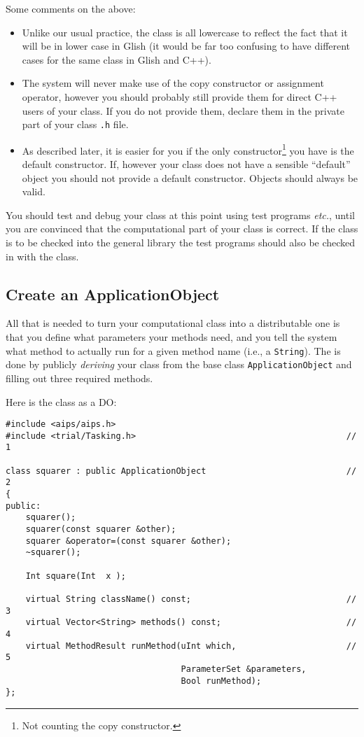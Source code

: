 Some comments on the above:
\begin{itemize}
    \item Unlike our usual practice, the class is all lowercase to
    reflect the fact that it will be in lower case in Glish (it would be
    far too confusing to have different cases for the same class in Glish
    and C++).

    \item The system will never make use of the copy constructor or
    assignment operator, however you should probably still provide them
    for direct C++ users of your class. If you do not provide them,
    declare them in the private part of your class {\tt .h} file.

    \item As described later, it is easier for you if the only
    constructor\footnote{Not counting the copy constructor.} you have
    is the default constructor. If, however your class does not have a
    sensible ``default'' object you should not provide a default
    constructor. Objects should always be valid.
\end{itemize}

You should test and debug your class at this point using test programs
{\em etc.}, until you are convinced that the computational part of
your class is correct. If the class is to be checked into the general
library the test programs should also be checked in with the class.

\subsection{Create an ApplicationObject}

All that is needed to turn your computational class into a
distributable one is that you define what parameters your methods
need, and you tell the system what method to actually run for a given
method name (i.e., a {\tt String}). The is done by publicly {\em
deriving} your class from the base class {\tt ApplicationObject} and
filling out three required methods.

Here is the class as a DO:
\begin{verbatim}
#include <aips/aips.h>
#include <trial/Tasking.h>                                          // 1

class squarer : public ApplicationObject                            // 2
{
public:
    squarer();
    squarer(const squarer &other);
    squarer &operator=(const squarer &other);
    ~squarer();

    Int square(Int  x );

    virtual String className() const;                               // 3
    virtual Vector<String> methods() const;                         // 4
    virtual MethodResult runMethod(uInt which,                      // 5
                                   ParameterSet &parameters,
                                   Bool runMethod);
};
\end{verbatim}

